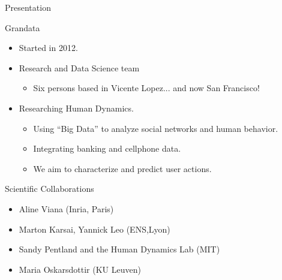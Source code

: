 \documentclass{beamer}
\begin{document}
\begin{frame}{Presentation}
	
	\begin{block}{Grandata}
		\begin{itemize}
			
			\item Started in 2012.
			\item Research and Data Science team
			\begin{itemize}
				\item Six persons based in Vicente Lopez... and now San Francisco!
			\end{itemize}
			\item Researching Human Dynamics.
			\begin{itemize}
				\item Using ``Big Data'' to analyze social networks and human behavior.
				\item Integrating banking and cellphone data.
				\item We aim to characterize and predict user actions.
			\end{itemize}
		\end{itemize}
		
	\end{block}
	
	\pause
	
	\begin{block}{Scientific Collaborations}
		\begin{itemize}
			\item Aline Viana (Inria, Paris)
			\item Marton Karsai, Yannick Leo (ENS,Lyon)
			\item Sandy Pentland and the Human Dynamics Lab (MIT)
			\item Maria Oskarsdottir (KU Leuven)
		\end{itemize}
	\end{block}
	
\end{frame}
\end{document}
